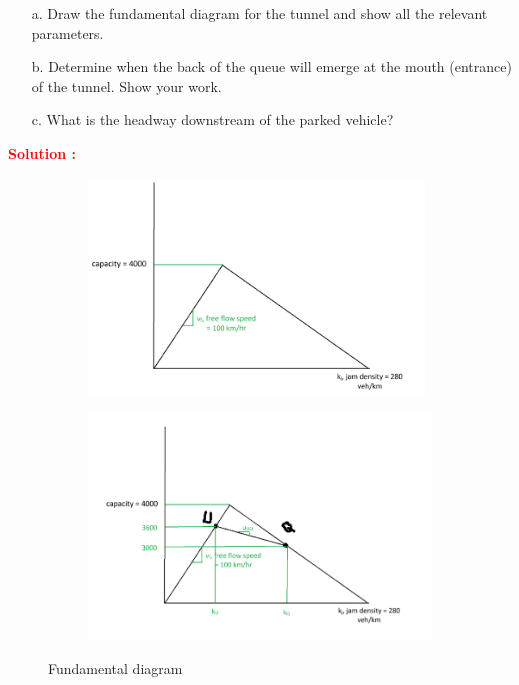 \documentclass[12pt]{article}
\begin{document}
\begin{enumerate}
    \item[a.] Draw the fundamental diagram for the tunnel and show all the relevant parameters.
    \item[b.] Determine when the back of the queue will emerge at the mouth (entrance) of the tunnel. Show your work.
    \item[c.] What is the headway downstream of the parked vehicle?
\end{enumerate}
\textbf{\textcolor{red}{Solution :}} 


\begin{figure}[h!]
    \centering
    \begin{subfigure}[b]{0.43\textwidth}
    \centering
    \includegraphics[width=0.98\textwidth]{img/P7_4a.png}
     \caption{}
     \end{subfigure}
     \begin{subfigure}[b]{0.43\textwidth}
     \centering
        \includegraphics[width=\textwidth]{img/P7_4b.png}
     \caption{}
     \end{subfigure}
     \caption{Fundamental diagram}\label{fig:P6_14}
\end{figure}
\end{document}
